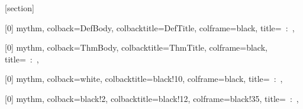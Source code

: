 [section]
\renewcommand{\theexsec}{\thesection.\arabic{exsec}}

\usepackage[most]{tcolorbox}



\makeatletter
\newcommand{\BeginNumberedItem}[3]{%
  \refstepcounter{thmsec}%
  \edef\ItemNumber{\thethmsec}%
  \hypertarget{#1}{}\label{#1}%
  \def\ItemType{#2}%
  \def\ItemTitle{#3}%
}
\newcommand{\BeginExerciseItem}[3]{%
  \refstepcounter{exsec}%
  \edef\ItemNumber{\theexsec}%
  \hypertarget{#1}{}\label{#1}%
  \def\ItemType{#2}%
  \def\ItemTitle{#3}%
}
\makeatother

[0]{%
  mythm,
  colback=DefBody,
  colbacktitle=DefTitle,
  colframe=black,
  title={\ItemType~\ItemNumber:~\ItemTitle},
}

[0]{%
  mythm,
  colback=ThmBody,
  colbacktitle=ThmTitle,
  colframe=black,
  title={\ItemType~\ItemNumber:~\ItemTitle},
}

[0]{%
  mythm,
  colback=white,
  colbacktitle=black!10,
  colframe=black,
  title={\ItemType~\ItemNumber:~\ItemTitle},
}

[0]{%
  mythm,
  colback=black!2,
  colbacktitle=black!12,
  colframe=black!35,
  title={\ItemType~\ItemNumber:~\ItemTitle},
}

